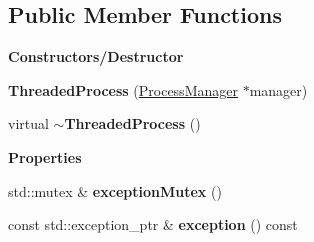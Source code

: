 \subsection*{Public Member Functions}
\begin{Indent}\textbf{ Constructors/\+Destructor}\par
\begin{DoxyCompactItemize}
\item 
\mbox{\label{classrev_1_1_threaded_process_a1de8871ebb29b5244054b7cf65f22378}} 
{\bfseries Threaded\+Process} (\mbox{\hyperlink{classrev_1_1_process_manager}{Process\+Manager}} $\ast$manager)
\item 
\mbox{\label{classrev_1_1_threaded_process_ad6bcc605098ff030d3f2e2dd0f6fc605}} 
virtual {\bfseries $\sim$\+Threaded\+Process} ()
\end{DoxyCompactItemize}
\end{Indent}
\begin{Indent}\textbf{ Properties}\par
\begin{DoxyCompactItemize}
\item 
\mbox{\label{classrev_1_1_threaded_process_a6e057f5df8add0d2726c9e96f72c5c86}} 
std\+::mutex \& {\bfseries exception\+Mutex} ()
\item 
\mbox{\label{classrev_1_1_threaded_process_a152d4972f920c8685dab3f5cab92a719}} 
const std\+::exception\+\_\+ptr \& {\bfseries exception} () const
\end{DoxyCompactItemize}
\end{Indent}
